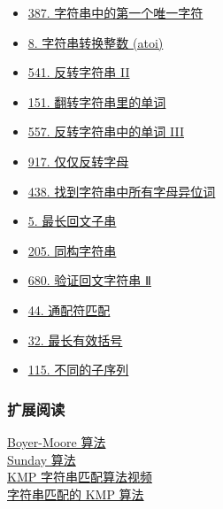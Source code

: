 \begin{itemize}
  \item \hyperref[leetcode:387]{387. 字符串中的第一个唯一字符}
  \item \hyperref[leetcode:8]{8. 字符串转换整数 (atoi)}
  \item \hyperref[leetcode:541]{541. 反转字符串 II}
  \item \hyperref[leetcode:151]{151. 翻转字符串里的单词}
  \item \hyperref[leetcode:557]{557. 反转字符串中的单词 III}
  \item \hyperref[leetcode:917]{917. 仅仅反转字母}
  \item \hyperref[leetcode:438]{438. 找到字符串中所有字母异位词}
  \item \hyperref[leetcode:5]{5. 最长回文子串}
  \item \hyperref[leetcode:205]{205. 同构字符串}
  \item \hyperref[leetcode:680]{680. 验证回文字符串 Ⅱ}
  \item \hyperref[leetcode:44]{44. 通配符匹配}
  \item \hyperref[leetcode:32]{32. 最长有效括号}
  \item \hyperref[leetcode:115]{115. 不同的子序列}
\end{itemize}

\subsubsection{扩展阅读}

\href{https://www.ruanyifeng.com/blog/2013/05/boyer-moore_string_search_algorithm.html}{Boyer-Moore 算法} \\
\href{https://blog.csdn.net/u012505432/article/details/52210975}{Sunday 算法} \\
\href{https://www.bilibili.com/video/av11866460?from=search&seid=17425875345653862171}{KMP 字符串匹配算法视频} \\
\href{http://www.ruanyifeng.com/blog/2013/05/Knuth%E2%80%93Morris%E2%80%93Pratt_algorithm.html}{字符串匹配的 KMP 算法}
